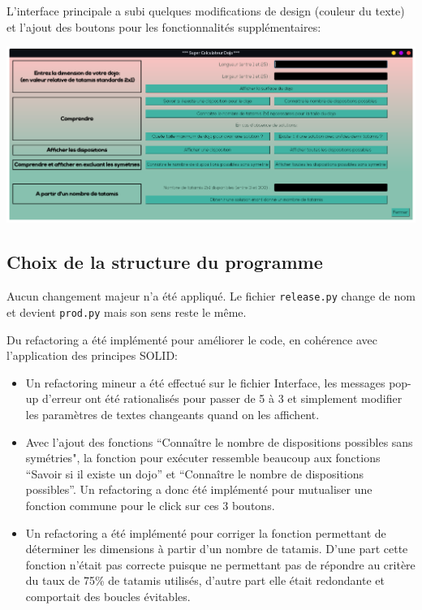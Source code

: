 L’interface principale a subi quelques modifications de design (couleur du texte) et l’ajout des boutons pour les
fonctionnalités supplémentaires:

\begin{center}
    \includegraphics[scale=0.25]{images/prodInterface.png}
\end{center}

\subsection{Choix de la structure du programme}

Aucun changement majeur n’a été appliqué. Le fichier \texttt{release.py} change de nom et devient \texttt{prod.py} mais son sens reste le même.

Du refactoring a été implémenté pour améliorer le code, en cohérence avec l’application des principes SOLID:
\begin{itemize}
    \item Un refactoring mineur a été effectué sur le fichier Interface, les messages pop-up d’erreur ont été rationalisés pour passer 
de 5 à 3 et simplement modifier les paramètres de textes changeants quand on les affichent.
    \item Avec l’ajout des fonctions “Connaître le nombre de dispositions possibles sans symétries", la fonction pour exécuter ressemble 
beaucoup aux fonctions “Savoir si il existe un dojo” et “Connaître le nombre de dispositions possibles”. Un refactoring a donc été 
implémenté pour mutualiser une fonction commune pour le click sur ces 3 boutons.
    \item Un refactoring a été implémenté pour corriger la fonction permettant de déterminer les dimensions à partir d'un nombre de tatamis. D'une part 
cette fonction n'était pas correcte puisque ne permettant pas de répondre au critère du taux de 75\% de tatamis utilisés, d'autre part elle était redondante
 et comportait des boucles évitables. 

\end{itemize}

